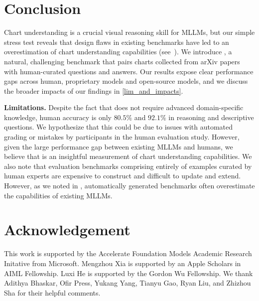 \section{Conclusion}
Chart understanding is a crucial visual reasoning skill for MLLMs, but our simple stress test reveals that design flaws in existing benchmarks have led to an overestimation of chart understanding capabilities (see~).
We introduce \ours{}, a natural, challenging benchmark that pairs charts collected from arXiv papers with human-curated questions and answers. 
Our results expose clear performance gaps across human, proprietary models and open-source models, and we discuss the broader impacts of our findings in \cref{lim_and_impacts}.

\textbf{Limitations. } 
Despite the fact that \ours{} does not require advanced domain-specific knowledge, human accuracy is only $80.5\%$ and $92.1\%$ in reasoning and descriptive questions.
We hypothesize that this could be due to issues with automated grading or mistakes by participants in the human evaluation study.
However, given the large performance gap between existing MLLMs and humans, we believe that \ours{} is an insightful measurement of chart understanding capabilities.
We also note that evaluation benchmarks comprising entirely of examples curated by human experts are expensive to construct and difficult to update and extend.
However, as we noted in , automatically generated benchmarks often overestimate the capabilities of existing MLLMs.

\section*{Acknowledgement}
This work is supported by the Accelerate Foundation Models Academic Research Initative from Microsoft. Mengzhou Xia is supported by an Apple Scholars in AIML Fellowship. Luxi He is supported by the Gordon Wu Fellowship. We thank Adithya Bhaskar, Ofir Press, Yukang Yang, Tianyu Gao, Ryan Liu, and Zhizhou Sha for their helpful comments.

\newpage
